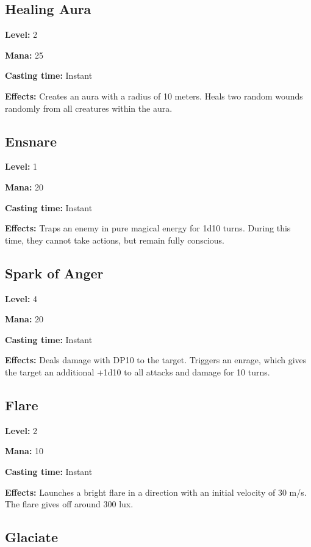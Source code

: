 \documentclass[]{article}
\begin{document}
\subsection{Healing Aura}\label{healing-aura}

\textbf{Level:} 2

\textbf{Mana:} 25

\textbf{Casting time:} Instant

\textbf{Effects:} Creates an aura with a radius of 10 meters. Heals two
random wounds randomly from all creatures within the aura.

\subsection{Ensnare}\label{ensnare}

\textbf{Level:} 1

\textbf{Mana:} 20

\textbf{Casting time:} Instant

\textbf{Effects:} Traps an enemy in pure magical energy for 1d10 turns.
During this time, they cannot take actions, but remain fully conscious.

\subsection{Spark of Anger}\label{spark-of-anger}

\textbf{Level:} 4

\textbf{Mana:} 20

\textbf{Casting time:} Instant

\textbf{Effects:} Deals damage with DP10 to the target. Triggers an
enrage, which gives the target an additional +1d10 to all attacks and
damage for 10 turns.

\subsection{Flare}\label{flare}

\textbf{Level:} 2

\textbf{Mana:} 10

\textbf{Casting time:} Instant

\textbf{Effects:} Launches a bright flare in a direction with an initial
velocity of 30 m/s. The flare gives off around 300 lux.

\subsection{Glaciate}\label{glaciate}
\end{document}

